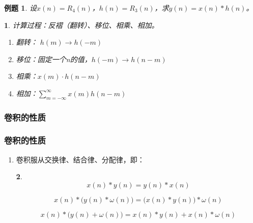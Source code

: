 \documentclass[notheorems,compress,mathserif,table]{beamer}
\newtheorem{example}{例题}
\newtheorem{dablock}{}
\begin{document}
\begin{frame}\frametitle{}%
\begin{example}
    设$x(n)=R_{4}(n)$，$h(n)=R_{3}(n)$，求$y(n)=x(n)*h(n)$。
\end{example}

\begin{dablock}
计算过程：反褶（翻转）、移位、相乘、相加。
              \begin{enumerate}
                \item 翻转： $h(m)\rightarrow h(-m)$
                \item 移位：固定一个n的值，$h(-m)\rightarrow h(n-m)$
                \item 相乘：$x(m)\cdot h(n-m)$
                \item 相加：$\sum_{m=-\infty}^{\infty}x(m)h(n-m)$
              \end{enumerate}
\end{dablock}
\end{frame}


\subsubsection*{卷积的性质}

\begin{frame}\frametitle{卷积的性质}%

\begin{enumerate}
  \item[(1)] 卷积服从交换律、结合律、分配律，即：
  \begin{dablock}
            \begin{equation*}
                x(n)*y(n) = y(n)*x(n)
            \end{equation*}

            \begin{equation*}
                x(n)*\big(y(n)*\omega(n)\big) = \big(x(n)*y(n)\big)*\omega(n)
            \end{equation*}

            \begin{equation*}
                x(n)*\big(y(n)+\omega(n)\big) = x(n)*y(n)+x(n)*\omega(n)
            \end{equation*}
 \end{dablock}
\end{enumerate}
\end{frame}
\end{document}
